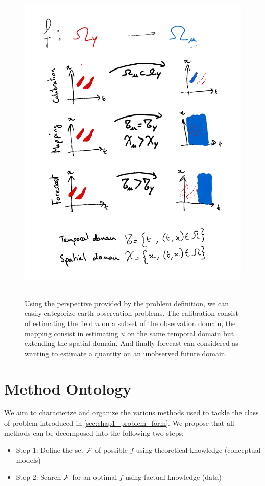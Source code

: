 \begin{bibunit}
\begin{figure}[htbp]
\begin{center}
\includegraphics[width=0.8\linewidth]{Chapitre1/Ch1-Figures/Task_ontology.png} \
\end{center}
\caption[Task characterization through the domains $\Omega_u$ and $\Omega_y$ of $u$ and $y$]
{\footnotesize Using the perspective provided by the problem definition, we can easily categorize earth observation problems.
The calibration consist of estimating the field $u$ on a subset of the observation domain, the mapping consist in estimating $u$ on the same temporal domain but extending the spatial domain.
And finally forecast can considered as wanting to estimate a quantity on an unobserved future domain.}
\label{fig:task_ontology}
\end{figure}

\section{Method Ontology}
We aim to characterize and organize the various methods used to tackle the class of problem introduced in \ref{sec:chap1_problem_form}. We propose that all methods can be decomposed into the following two steps:
\begin{itemize}
\item Step 1: Define the set $\cal{F}$ of possible $f$ using theoretical knowledge (conceptual models)
\item Step 2: Search $\cal{F}$ for an optimal $f$ using factual knowledge (data)
\end{itemize}


\end{bibunit}
